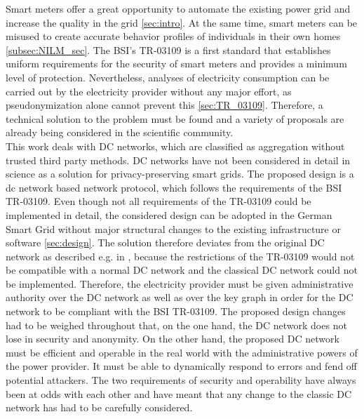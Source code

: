 Smart meters offer a great opportunity to automate the existing power grid and increase the quality in the grid \ref{sec:intro}. At the same time, smart meters can be misused to create accurate behavior profiles of individuals in their own homes \ref{subsec:NILM_sec}. The \gls{BSI}'s \gls{TR-03109} is a first standard that establishes uniform requirements for the security of smart meters and provides a minimum level of protection. Nevertheless, analyses of electricity consumption can be carried out by the electricity provider without any major effort, as pseudonymization alone cannot prevent this \ref{sec:TR_03109}. Therefore, a technical solution to the problem must be found and a variety of proposals are already being considered in the scientific community.\\ This work deals with DC networks, which are classified as aggregation without trusted third party methods. DC networks have not been considered in detail in science as a solution for privacy-preserving smart grids. The proposed design is a dc network based network protocol, which follows the requirements of the \gls{BSI} \gls{TR-03109}. Even though not all requirements of the \gls{TR-03109} could be implemented in detail, the considered design can be adopted in the German Smart Grid without major structural changes to the existing infrastructure or software \ref{sec:design}. The solution therefore deviates from the original DC network as described e.g. in \cite{chaum1988dining}, because the restrictions of the \gls{TR-03109} would not be compatible with a normal DC network and the classical DC network could not be implemented. Therefore, the electricity provider must be given administrative authority over the DC network as well as over the key graph in order for the DC network to be compliant with the \gls{BSI} \gls{TR-03109}. The proposed design changes had to be weighed throughout that, on the one hand, the DC network does not lose in security and anonymity. On the other hand, the proposed DC network must be efficient and operable in the real world with the administrative powers of the power provider. It must be able to dynamically respond to errors and fend off potential attackers. The two requirements of security and operability have always been at odds with each other and have meant that any change to the classic DC network has had to be carefully considered. \\
